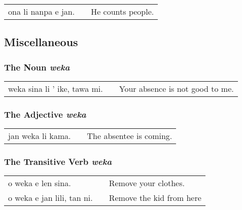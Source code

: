 \begin{supertabular}{p{5,5cm}|ll}
ona li nanpa e jan. && He counts people. \\
\end{supertabular} 
%
%
%
%
%
\subsection*{Miscellaneous}
%
%
\subsubsection*{The Noun \textit{weka}}
%

\begin{supertabular}{p{5,5cm}|ll}
weka sina li ' ike, tawa mi. && Your absence is not good to me. \\
\end{supertabular} 
%
\subsubsection*{The Adjective \textit{weka}}
%

\begin{supertabular}{p{5,5cm}|ll}
jan weka li kama. && The absentee is coming. \\
\end{supertabular} 

%
\subsubsection*{The Transitive Verb \textit{weka}}
%

\begin{supertabular}{p{5,5cm}|ll}
o weka e len sina. && Remove your clothes. \\
o weka e jan lili, tan ni. && Remove the kid from here \\ 
\end{supertabular} 

